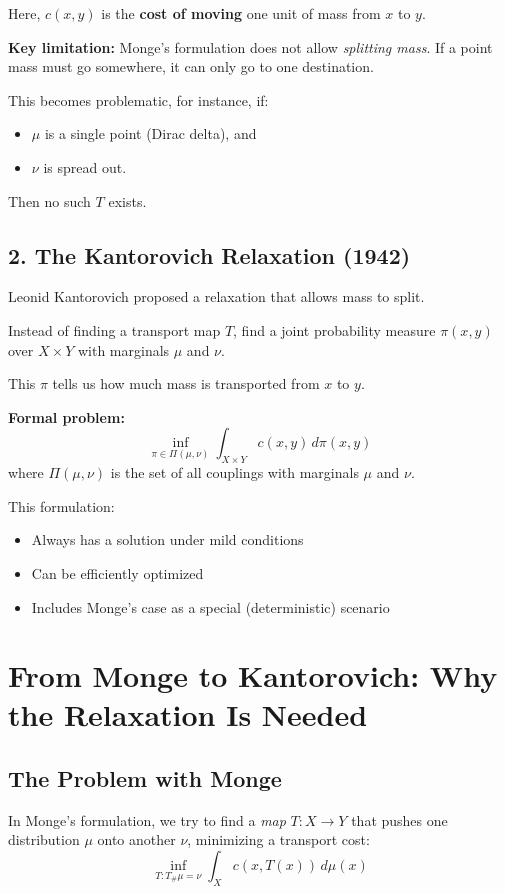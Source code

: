 \documentclass[11pt]{article}
\begin{document}
\noindent Here, $c(x, y)$ is the \textbf{cost of moving} one unit of mass from $x$ to $y$.

\textbf{Key limitation:} Monge’s formulation does not allow \emph{splitting mass}. If a point mass must go somewhere, it can only go to one destination.

\vspace{0.5em}
This becomes problematic, for instance, if:
\begin{itemize}
  \item $\mu$ is a single point (Dirac delta), and
  \item $\nu$ is spread out.
\end{itemize}
Then no such $T$ exists.

\subsection*{2. The Kantorovich Relaxation (1942)}

Leonid Kantorovich proposed a relaxation that allows mass to split.

\begin{highlight}
Instead of finding a transport map $T$, find a joint probability measure $\pi(x, y)$ over $X \times Y$ with marginals $\mu$ and $\nu$.
\end{highlight}

This $\pi$ tells us how much mass is transported from $x$ to $y$.

\textbf{Formal problem:}
\[
\inf_{\pi \in \Pi(\mu, \nu)} \int_{X \times Y} c(x, y)\,d\pi(x, y)
\]
where $\Pi(\mu, \nu)$ is the set of all couplings with marginals $\mu$ and $\nu$.

\vspace{0.5em}
This formulation:
\begin{itemize}
  \item Always has a solution under mild conditions
  \item Can be efficiently optimized
  \item Includes Monge’s case as a special (deterministic) scenario
\end{itemize}

\section*{From Monge to Kantorovich: Why the Relaxation Is Needed}

\subsection*{The Problem with Monge}
In Monge's formulation, we try to find a \emph{map} $T : X \to Y$ that pushes one distribution $\mu$ onto another $\nu$, minimizing a transport cost:
\[
\inf_{T : T_\#\mu = \nu} \int_X c(x, T(x)) \, d\mu(x)
\]
\end{document}

